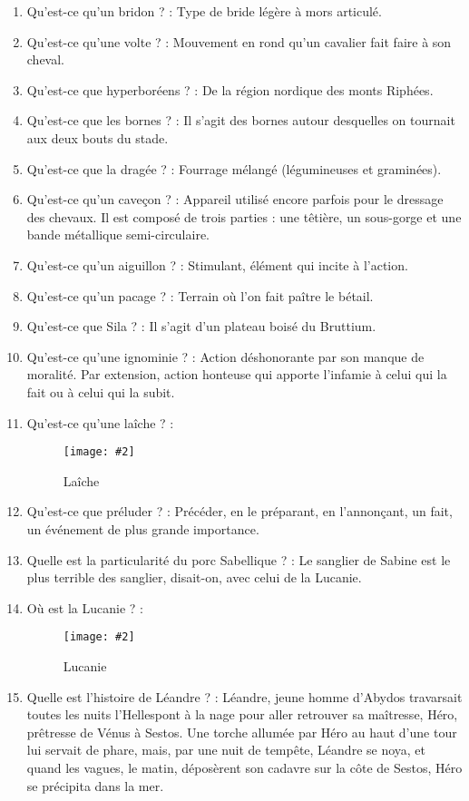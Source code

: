 \documentclass[a4paper, 11pt, hidelinks]{article}
\newcommand{\img}[4]{\begin{figure}[!ht]
    \centering
    \texttt{[image: \#2]}
    \caption{#3}
    \label{#4}
    \end{figure} }
\begin{document}
\begin{enumerate}
      \item Qu'est-ce qu'un bridon ? : Type de bride légère à mors articulé.
      \item Qu'est-ce qu'une volte ? : Mouvement en rond qu'un cavalier fait faire à son cheval.
      \item Qu'est-ce que hyperboréens ? : De la région nordique des monts Riphées.
      \item Qu'est-ce que les bornes ? : Il s'agit des bornes autour desquelles on tournait aux deux bouts du stade.
      \item Qu'est-ce que la dragée ? : Fourrage mélangé (légumineuses et graminées).
      \item Qu'est-ce qu'un caveçon ? : Appareil utilisé encore parfois pour le dressage des chevaux. Il est composé de trois parties : une têtière, un sous-gorge et une bande métallique semi-circulaire.
      \item Qu'est-ce qu'un aiguillon ? : Stimulant, élément qui incite à l'action.
      \item Qu'est-ce qu'un pacage ? : Terrain où l'on fait paître le bétail.
      \item Qu'est-ce que Sila ? : Il s'agit d'un plateau boisé du Bruttium.
      \item Qu'est-ce qu'une ignominie ? : Action déshonorante par son manque de moralité. Par extension, action honteuse qui apporte l'infamie à celui qui la fait ou à celui qui la subit.
      \item Qu'est-ce qu'une laîche ? : 
            \img{0.2}{Laîche.jpg}{Laîche}{122}
      \item Qu'est-ce que préluder ? : Précéder, en le préparant, en l'annonçant, un fait, un événement de plus grande importance.
      \item Quelle est la particularité du porc Sabellique ? : Le sanglier de Sabine est le plus terrible des sanglier, disait-on, avec celui de la Lucanie.
      \item Où est la Lucanie ? : 
            \img{0.3}{Lucanie.png}{Lucanie}{123}
      \item Quelle est l'histoire de Léandre ? : Léandre, jeune homme d'Abydos travarsait toutes les nuits l'Hellespont à la nage pour aller retrouver sa maîtresse, Héro, prêtresse
            de Vénus à Sestos. Une torche allumée par Héro au haut d'une tour lui servait de phare, mais, par une nuit de tempête, Léandre se noya, et quand les vagues, le matin,
            déposèrent son cadavre sur la côte de Sestos, Héro se précipita dans la mer. 

\end{enumerate}
\end{document}
